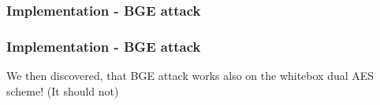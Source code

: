 \documentclass{beamer}
\begin{document}
\begin{frame}
    \frametitle{Implementation - BGE attack}
    \centerline{}
\end{frame}

\begin{frame}
    \frametitle{Implementation - BGE attack}
    We then discovered, that BGE attack works also on the whitebox dual AES scheme! (It should not)
    
    \bigskip
    
    \centerline{}
\end{frame}
\end{document}
